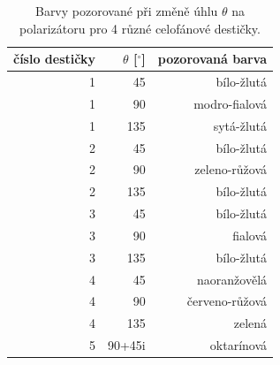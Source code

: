\documentclass[english]{article}
\begin{document}
		
		
		\begin{table}[htbp]
		  \centering
		    \begin{tabular}{rrr}
		    \toprule
		    \textbf{číslo destičky} & \boldmath{}\textbf{$\theta$ [$^\circ$]}\unboldmath{} & \textbf{pozorovaná barva} \\
		    \midrule
		    1     & 45    & bílo-žlutá \\
		    1     & 90    & modro-fialová \\
		    1     & 135   & sytá-žlutá \\
		    2     & 45    & bílo-žlutá \\
		    2     & 90    & zeleno-růžová \\
		    2     & 135   & bílo-žlutá \\
		    3     & 45    & bílo-žlutá \\
		    3     & 90    & fialová \\
		    3     & 135   & bílo-žlutá \\
		    4     & 45    & naoranžovělá \\
		    4     & 90    & červeno-růžová \\
		    4     & 135   & zelená \\
		    \textcolor{light-gray}{5} & \textcolor{light-gray}{90+45i} & \textcolor{light-gray}{oktarínová}\\ 
		    \bottomrule
		    \end{tabular}%
		  \caption{Barvy pozorované při změně úhlu $\theta$ na polarizátoru pro 4 různé celofánové destičky.}
		  \label{tab:barvicky}%
		\end{table}%
		
\end{document}
